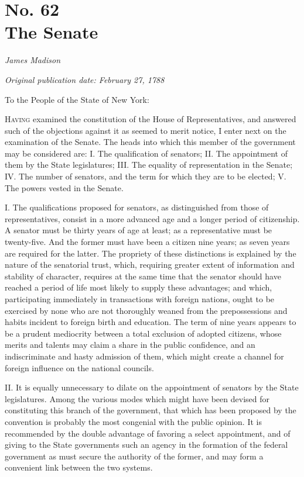 \chapter[No. 62: The Senate]{No. 62\\ {\small The Senate}}

\textit{James Madison}

\textit{Original publication date: February 27, 1788}
\vspace{1cm}

To the People of the State of New York:
\vspace{.4cm}

\textsc{Having} examined the constitution of the House of Representatives, and answered such of the objections against it as seemed to merit notice, I enter next on the examination of the Senate. 
The heads into which this member of the government may be considered are: I. 
The qualification of senators; II. 
The appointment of them by the State legislatures; III. 
The equality of representation in the Senate; IV. 
The number of senators, and the term for which they are to be elected; V. 
The powers vested in the Senate.

I. 
The qualifications proposed for senators, as distinguished from those of representatives, consist in a more advanced age and a longer period of citizenship. 
A senator must be thirty years of age at least; as a representative must be twenty-five. 
And the former must have been a citizen nine years; as seven years are required for the latter. 
The propriety of these distinctions is explained by the nature of the senatorial trust, which, requiring greater extent of information and stability of character, requires at the same time that the senator should have reached a period of life most likely to supply these advantages; and which, participating immediately in transactions with foreign nations, ought to be exercised by none who are not thoroughly weaned from the prepossessions and habits incident to foreign birth and education. 
The term of nine years appears to be a prudent mediocrity between a total exclusion of adopted citizens, whose merits and talents may claim a share in the public confidence, and an indiscriminate and hasty admission of them, which might create a channel for foreign influence on the national councils.

II. 
It is equally unnecessary to dilate on the appointment of senators by the State legislatures. 
Among the various modes which might have been devised for constituting this branch of the government, that which has been proposed by the convention is probably the most congenial with the public opinion. 
It is recommended by the double advantage of favoring a select appointment, and of giving to the State governments such an agency in the formation of the federal government as must secure the authority of the former, and may form a convenient link between the two systems.

